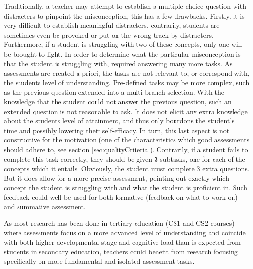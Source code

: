 Traditionally, a teacher may attempt to establish a multiple-choice question with distracters to pinpoint the misconception, this has a few drawbacks. Firstly, it is very difficult to establish meaningful distracters, contrarily, students are sometimes even be provoked or put on the wrong track by distracters. Furthermore, if a student is struggling with two of these concepts, only one will be brought to light. In order to determine what the particular misconception is that the student is struggling with, required answering many more tasks. As assessments are created a priori, the tasks are not relevant to, or correspond with, the students level of understanding. Pre-defined tasks may be more complex, such as the previous question extended into a multi-branch selection. With the knowledge that the student could not answer the previous question, such an extended question is not reasonable to ask. It does not elicit any extra knowledge about the students level of attainment, and thus only bourdons the student's time and possibly lowering their self-efficacy. In turn, this last aspect is not constructive for the motivation (one of the characteristics which good assessments should adhere to, see section \ref{sec:qualityCriteria}). Contrarily, if a student fails to complete this task correctly, they should be given 3 subtasks, one for each of the concepts which it entails. Obviously, the student must complete 3 extra questions. But it does allow for a more precise assessment, pointing out exactly which concept the student is struggling with and what the student is proficient in. Such feedback could well be used for both formative (feedback on what to work on) and summative assessment.








As most research has been done in tertiary education (CS1 and CS2 courses) where assessments focus on a more advanced level of understanding and coincide with both higher developmental stage and cognitive load than is expected from students in secondary education, teachers could benefit from research focusing specifically on more fundamental and isolated assessment tasks.


